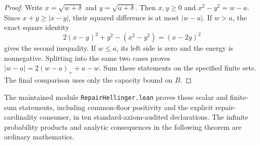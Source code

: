 \documentclass[11pt]{article}
\theoremstyle{definition}
\begin{document}
\begin{proof}
Write $x=\sqrt{w+\delta}$ and $y=\sqrt{a+\delta}$.
Then $x,y\ge0$ and $x^2-y^2=w-a$.
Since $x+y\ge|x-y|$, their squared difference is at most
$|w-a|$. If $w>a$, the exact square identity
\[
 2(x-y)^2+y^2-(x^2-y^2)=(x-2y)^2
\]
gives the second inequality. If $w\le a$, its left side is
zero and the energy is nonnegative. Splitting into the same
two cases proves $|w-a|=2(w-a)_++a-w$.
Sum these statements on the specified finite sets.
The final comparison uses only the capacity bound on $B$.
\end{proof}

The maintained module \texttt{RepairHellinger.lean} proves
these scalar and finite-sum statements, including
common-floor positivity and the explicit repair-cardinality
consumer, in ten standard-axiom-audited declarations.
The infinite probability products and analytic consequences
in the following theorem are ordinary mathematics.
\end{document}
